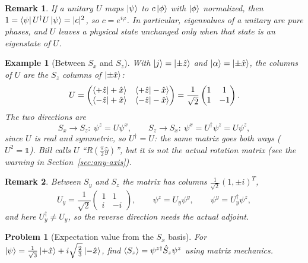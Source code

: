 \documentclass{article}
\newtheorem{problem}{Problem}
\newtheorem*{example}{Example}
\newtheorem{remark}{Remark}
\newcommand{\id}{\mathds{1}}
\begin{document}
\begin{remark}
    If a unitary $U$ maps $\ket{\psi}$ to $c\ket{\phi}$ with $\ket{\phi}$ normalized, then $1 = \bra{\psi}U^\dagger U\ket{\psi} = |c|^2$, so $c = e^{i\varphi}$. In particular, eigenvalues of a unitary are pure phases, and $U$ leaves a physical state unchanged only when that state is an eigenstate of $U$.
\end{remark}
\begin{example}[Between $S_x$ and $S_z$]
    With $\ket{j} = \ket{\pm\hat{z}}$ and $\ket{\alpha} = \ket{\pm\hat{x}}$, the columns of $U$ are the $S_z$ columns of $\ket{\pm\hat{x}}$:
    \begin{equation}
        \label{eq:Uzx}
        U = \begin{pmatrix} \braket{+\hat{z}|+\hat{x}} & \braket{+\hat{z}|-\hat{x}} \\ \braket{-\hat{z}|+\hat{x}} & \braket{-\hat{z}|-\hat{x}} \end{pmatrix} = \frac{1}{\sqrt{2}}\begin{pmatrix} 1 & 1 \\ 1 & -1 \end{pmatrix}.
    \end{equation}
    The two directions are
    \[S_x \to S_z: \ \psi^z = U\psi^x, \qquad S_z \to S_x: \ \psi^x = U^\dagger\psi^z = U\psi^z,\]
    since $U$ is real and symmetric, so $U^\dagger = U$: the same matrix goes both ways ($U^2 = \id$). Bill calls $U$ ``$R\left(\tfrac{\pi}{2}\hat{y}\right)$'', but it is not the actual rotation matrix (see the warning in Section~\ref{sec:any-axis}).
\end{example}
\begin{remark}
    Between $S_y$ and $S_z$ the matrix has columns $\frac{1}{\sqrt{2}}(1, \pm i)^T$,
    \[U_y = \frac{1}{\sqrt{2}}\begin{pmatrix} 1 & 1 \\ i & -i \end{pmatrix}, \qquad \psi^z = U_y\psi^y, \qquad \psi^y = U_y^\dagger\psi^z,\]
    and here $U_y^\dagger \neq U_y$, so the reverse direction needs the actual adjoint.
\end{remark}
\begin{problem}[Expectation value from the $S_x$ basis]
    For $\ket{\psi} = \frac{1}{\sqrt{3}}\ket{+\hat{x}} + i\sqrt{\frac{2}{3}}\ket{-\hat{x}}$, find $\braket{S_z} = \psi^{z\dagger}\hat{S}_z\psi^z$ using matrix mechanics.
\end{problem}
\end{document}

